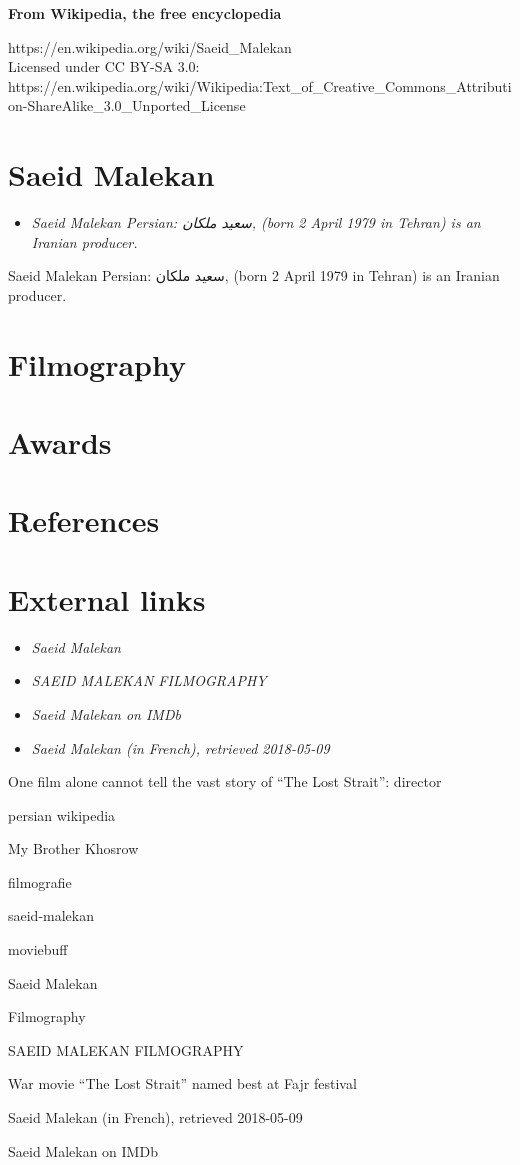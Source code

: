 \textbf{From Wikipedia, the free encyclopedia}

https://en.wikipedia.org/wiki/Saeid\_Malekan\\
Licensed under CC BY-SA 3.0:\\
https://en.wikipedia.org/wiki/Wikipedia:Text\_of\_Creative\_Commons\_Attribution-ShareAlike\_3.0\_Unported\_License

\section{Saeid Malekan}\label{saeid-malekan}

\begin{itemize}
\item
  \emph{Saeid Malekan Persian: سعید ملکان‎, (born 2 April 1979 in
  Tehran) is an Iranian producer.}
\end{itemize}

Saeid Malekan Persian: سعید ملکان‎, (born 2 April 1979 in Tehran) is an
Iranian producer.

\section{Filmography}\label{filmography}

\section{Awards}\label{awards}

\section{References}\label{references}

\section{External links}\label{external-links}

\begin{itemize}
\item
  \emph{Saeid Malekan}
\item
  \emph{SAEID MALEKAN FILMOGRAPHY}
\item
  \emph{Saeid Malekan on IMDb}
\item
  \emph{Saeid Malekan (in French), retrieved 2018-05-09}
\end{itemize}

One film alone cannot tell the vast story of ``The Lost Strait'':
director

persian wikipedia

My Brother Khosrow

filmografie

saeid-malekan

moviebuff

Saeid Malekan

Filmography

SAEID MALEKAN FILMOGRAPHY

War movie ``The Lost Strait'' named best at Fajr festival

Saeid Malekan (in French), retrieved 2018-05-09

Saeid Malekan on IMDb
